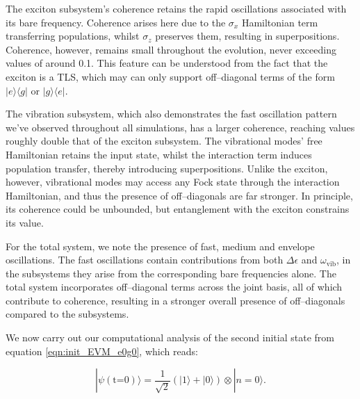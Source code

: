 \documentclass[11pt]{article}
\newcounter{subsubsubsection}[subsubsection]
\begin{document}
The exciton subsystem's coherence retains the rapid oscillations associated with its bare frequency. Coherence arises here due to the $\sigma_x$ Hamiltonian term transferring populations, whilst $\sigma_z$ preserves them, resulting in  superpositions. Coherence, however, remains small throughout the evolution, never exceeding values of around 0.1. This feature can be understood from the fact that the exciton is a TLS, which may can only support off--diagonal terms of the form $|e\rangle\langle g|$ or $|g\rangle\langle e|$.

The vibration subsystem, which also demonstrates the fast oscillation pattern we've observed throughout all simulations, has a larger coherence, reaching values roughly double that of the exciton subsystem. The vibrational modes' free Hamiltonian retains the input state, whilst the interaction term induces population transfer, thereby introducing superpositions. Unlike the exciton, however, vibrational modes may access any Fock state through the interaction Hamiltonian, and thus the presence of off--diagonals are far stronger. In principle, its coherence could be unbounded, but entanglement with the exciton constrains its value.

For the total system, we note the presence of fast, medium and envelope oscillations. The fast oscillations contain contributions from both $\Delta\epsilon$ and $\omega_{\scriptscriptstyle \text{vib}}$, in the subsystems they arise from the corresponding bare frequencies alone. The total system incorporates off--diagonal terms across the joint basis, all of which contribute to coherence, resulting in a stronger overall presence of off--diagonals compared to the subsystems.


We now carry out our computational analysis of the second initial state from equation \ref{eqn:init_EVM_e0g0}, which reads:

\begin{equation*}
    |\psi (\text{t=0})\rangle = \frac{1}{\sqrt{2}}(|1\rangle + |0\rangle)\otimes|n=0\rangle.
\end{equation*}
\end{document}
